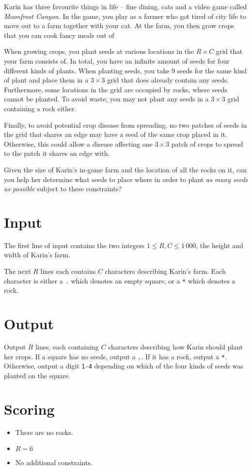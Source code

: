 Karin has three favourite things in life -- fine dining, cats and a video game called \emph{Moonfrost Canyon}.
In the game, you play as a farmer who got tired of city life to move out to a farm together with your cat.
At the farm, you then grow crops that you can cook fancy meals out of

When growing crops, you plant seeds at various locations in the $R \times C$ grid that your farm consists of.
In total, you have an infinite amount of seeds for four different kinds of plants. 
When planting seeds, you take 9 seeds for the same kind of plant and place them in a $3 \times 3$ grid that does already contain any seeds.
Furthermore, some locations in the grid are occupied by rocks, where seeds cannot be planted.
To avoid waste, you may not plant any seeds in a $3 \times 3$ grid containing a rock either.

Finally, to avoid potential crop disease from spreading, no two patches of seeds in the grid that shares an edge may have a seed of the same crop placed in it.
Otherwise, this could allow a disease affecting one $3 \times 3$ patch of crops to spread to the patch it shares an edge with.

Given the size of Karin's in-game farm and the location of all the rocks on it, can you help her determine what seeds to place where in order to plant \emph{as many seeds as possible} subject to these constraints?

\section*{Input}
The first line of input contains the two integers $1 \le R, C \le 1\,000$, the height and width of Karin's farm.

The next $R$ lines each contains $C$ characters describing Karin's farm.
Each character is either a \texttt{.} which denotes an empty square, or a \texttt{*} which denotes a rock.

\section*{Output}
Output $R$ lines, each containing $C$ characters describing how Karin should plant her crops.
If a square has no seeds, output a \texttt{.}.
If it has a rock, output a \texttt{*}.
Otherwise, output a digit \texttt{1-4} depending on which of the four kinds of seeds was planted on the square.

\section*{Scoring}
\begin{itemize}
  \item There are no rocks.
  \item $R = 6$
  \item No additional constraints.
\end{itemize}

